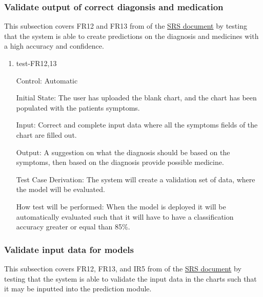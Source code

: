 \documentclass[12pt, titlepage]{article}
\begin{document}
\subsubsection{Validate output of correct diagonsis and medication} \label{section:4.1.6}

This subsection covers FR12 and FR13 from of the \href{https://github.com/Inreet-Kaur/capstone/blob/main/docs/SRS/SRS.pdf}{SRS document} \citep{SRS} by testing that the system is able to create predictions on the diagnosis and medicines with a high accuracy and confidence.

\begin{enumerate}

\item{test-FR12,13} \label{test-FR12,13}

Control: Automatic

Initial State: The user has uploaded the blank chart, and the chart has been populated with the patients symptoms.

Input: Correct and complete input data where all the symptoms fields of the chart are filled out.

Output: A suggestion on what the diagnosis should be based on the symptoms, then based on the diagnosis provide possible medicine.

Test Case Derivation: The system will create a validation set of data, where the model will be evaluated. 

How test will be performed: When the model is deployed it will be automatically evaluated such that it will have to have a classification accuracy greater or equal than 85\%.

\end{enumerate}


\subsubsection{Validate input data for models} \label{section:4.1.7}
This subsection covers FR12, FR13, and IR5 from of the \href{https://github.com/Inreet-Kaur/capstone/blob/main/docs/SRS/SRS.pdf}{SRS document} \citep{SRS} by testing that the system is able to validate the input data in the charts such that it may be inputted into the prediction module.
\end{document}
